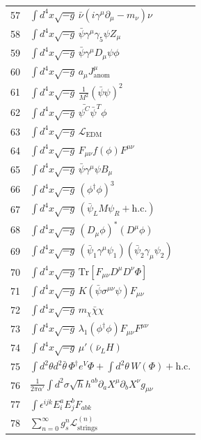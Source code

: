\documentclass[12pt,a4paper]{article}
\begin{document}
\begin{longtable}{r p{}}
	57 & \(\displaystyle \int d^4x\sqrt{-g}\,\bar\nu(i\gamma^\mu\partial_\mu - m_\nu)\nu\) \\
	58 & \(\displaystyle \int d^4x\sqrt{-g}\,\bar\psi\gamma^\mu\gamma_5\psi Z_\mu\) \\
	59 & \(\displaystyle \int d^4x\sqrt{-g}\,\bar\psi\gamma^\mu D_\mu\psi\phi\) \\
	60 & \(\displaystyle \int d^4x\sqrt{-g}\,a_\mu J^\mu_{\text{anom}}\) \\
	61 & \(\displaystyle \int d^4x\sqrt{-g}\,\frac{1}{M^2}(\bar\psi\psi)^2\) \\
	62 & \(\displaystyle \int d^4x\sqrt{-g}\,\bar{\psi^C}\bar{\psi}^T\phi\) \\
	63 & \(\displaystyle \int d^4x\sqrt{-g}\,\mathcal{L}_{\text{EDM}}\) \\
	64 & \(\displaystyle \int d^4x\sqrt{-g}\,F_{\mu\nu}f(\phi)F^{\mu\nu}\) \\
	65 & \(\displaystyle \int d^4x\sqrt{-g}\,\bar\psi\gamma^\mu\psi B_\mu\) \\
	66 & \(\displaystyle \int d^4x\sqrt{-g}\,(\phi^\dagger\phi)^3\) \\
	67 & \(\displaystyle \int d^4x\sqrt{-g}\,(\bar\psi_L M \psi_R + \text{h.c.})\) \\
	68 & \(\displaystyle \int d^4x\sqrt{-g}\,(D_\mu\phi)^*(D^\mu\phi)\) \\
	69 & \(\displaystyle \int d^4x\sqrt{-g}\,(\bar\psi_1\gamma^\mu\psi_1)(\bar\psi_2\gamma_\mu\psi_2)\) \\
	70 & \(\displaystyle \int d^4x\sqrt{-g}\,\mathrm{Tr}[F_{\mu\nu}D^\mu D^\nu\Phi]\) \\
	71 & \(\displaystyle \int d^4x\sqrt{-g}\,K(\bar\psi\sigma^{\mu\nu}\psi)F_{\mu\nu}\) \\
	72 & \(\displaystyle \int d^4x\sqrt{-g}\,m_\chi\bar\chi\chi\) \\
	73 & \(\displaystyle \int d^4x\sqrt{-g}\,\lambda_1(\phi^\dagger\phi)F_{\mu\nu}F^{\mu\nu}\) \\
	74 & \(\displaystyle \int d^4x\sqrt{-g}\,\mu'(\bar\nu_L H)\) \\
	75 & \(\displaystyle \int d^2\theta d^2\bar\theta\,\Phi^\dagger e^V\Phi + \int d^2\theta\,W(\Phi) + \text{h.c.}\) \\
	76 & \(\displaystyle \frac{1}{2\pi\alpha'}\int d^2\sigma\sqrt{h}h^{ab}\partial_a X^\mu\partial_b X^\nu g_{\mu\nu}\) \\
	77 & \(\displaystyle \int \epsilon^{ijk}E_i^a E_j^b F_{ab k}\) \\
	78 & \(\displaystyle \sum_{n=0}^\infty g_s^n \mathcal{L}^{(n)}_{\text{strings}}\) \\

\end{longtable}
\end{document}
